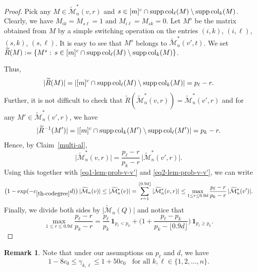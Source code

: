 \documentclass[12pt]{article}
\theoremstyle{definition}
\newtheorem{Remark}[theorem]{Remark}
\theoremstyle{plain}
\newcommand{\supp}{{\rm supp\,}}
\def\MatrixSet{{\mathcal M}_n}
\def\Col{{\rm col}}
\begin{document}
\begin{proof}
Pick any $M\in \widetilde\MatrixSet^{*}(v,r)$ and
$s\in [m]^c\cap\supp\Col_{\ell}(M) \setminus \supp\Col_k(M)$. Clearly, we have $M_{ik}=M_{s\ell}=1$ and 
$M_{i\ell}=M_{sk}=0$. Let $M^s$ be the matrix obtained from $M$ by a simple switching operation on the entries
$(i,k)$, $(i,\ell)$, $(s,k)$, $(s,\ell)$.
It is easy to see that $M^s$ belongs to $\widetilde\MatrixSet^{*}(v',t)$.
We set $\widetilde R(M):=\{M^s:\,s\in [m]^c\cap\supp\Col_{\ell}(M) \setminus \supp\Col_k(M)\}$.

Thus,
 $$
\vert  \widetilde R(M)\vert= \vert [m]^c\cap\supp\Col_\ell(M) \setminus \supp\Col_k(M)\vert= p_\ell-r.
 $$
Further, it is not difficult to check that
$\widetilde R(\widetilde\MatrixSet^{*}(v,r))=\widetilde\MatrixSet^{*}(v',r)$
and for any $M'\in \widetilde\MatrixSet^{*}(v',r)$, we have 
  $$
\vert  \widetilde R^{-1}(M')\vert= \vert [m]^c\cap\supp\Col_k(M') \setminus \supp\Col_\ell(M')\vert= p_k-r.
 $$
Hence, by Claim~\ref{multi-al},
$$
\vert \widetilde\MatrixSet^{*}(v,r)\vert 
= \frac{p_\ell-r}{p_k-r}\, \vert \widetilde\MatrixSet^{*}(v',r)\vert .
$$
Using this together with \eqref{eq1-lem-prob-v-v'} and \eqref{eq2-lem-prob-v-v'}, we can write
$$
\big(1-\exp(-c_{\ref{th-codegree}}d)\big)\, \vert \widetilde\MatrixSet(v)\vert\leq \vert \widetilde\MatrixSet^{*}(v)\vert 
=\sum_{r=1}^{\lfloor 0.9d\rfloor}\vert \widetilde\MatrixSet^{*}(v,r)\vert   
\leq \max_{1\leq r\leq 0.9d} \frac{p_\ell-r}{p_k-r}\, \vert \widetilde\MatrixSet^{*}(v')\vert. 
$$
Finally, we divide both sides by $\vert\widetilde\MatrixSet(Q)\vert$ and notice that 
$$
\max_{1\leq r\leq 0.9d} \frac{p_\ell-r}{p_k-r}= 
\frac{p_\ell}{p_k}\, \mathbf{1}_{p_\ell<p_k}+ 
\Big( 1+\frac{p_\ell -p_k}{p_k-\lfloor 0.9d\rfloor }\Big)\, \mathbf{1}_{p_\ell\geq p_k}.
$$
\end{proof}
\begin{Remark}\label{rem: gamma}
Note that under our assumptions on $p_\ell$ and $d$,
we have
$$1-8c_0\leq\gamma_{k,\ell}\leq 1+50c_0\;\;\mbox{ for all $k,\ell\in\{1,2,\ldots,n\}$}.$$
\end{Remark}

\bigskip
\end{document}
